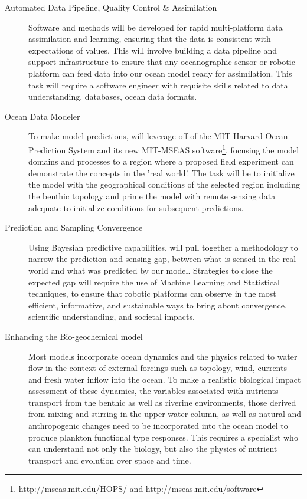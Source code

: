 \begin{description}

\item[Automated Data Pipeline, Quality Control \& Assimilation] Software and methods will be developed for
  rapid multi-platform data assimilation and learning, ensuring that the data is
  consistent with expectations of values. This will involve building a
  data pipeline and support infrastructure to ensure that any
  oceanographic sensor or robotic platform can feed data into our ocean
  model ready for assimilation. This task will require a software
  engineer with requisite skills related to data understanding,
  databases, ocean data formats.

\item[Ocean Data Modeler] To make model predictions, \pro will
  leverage off of the MIT Harvard Ocean Prediction
  System and its new MIT-MSEAS software\footnote{\url{http://mseas.mit.edu/HOPS/} and \url{http://mseas.mit.edu/software}}, focusing
  the model domains and processes to a region where a proposed field experiment
  can demonstrate the concepts in the 'real world'. The task will be
  to initialize the model with the geographical conditions of the
  selected region including the benthic topology and prime the model
  with remote sensing data adequate to initialize conditions for
  subsequent predictions.

\item[Prediction and Sampling Convergence] Using Bayesian predictive
  capabilities, \pro will pull together a methodology to narrow the
  prediction and sensing gap, between what is sensed in the real-world
  and what was predicted by our model. Strategies to close the expected
  gap will require the use of Machine Learning and Statistical
  techniques, to ensure that robotic platforms can observe in the most efficient, informative, and sustainable ways to
  bring about convergence, scientific understanding, and societal impacts. 

\item[Enhancing the Bio-geochemical model] Most models incorporate ocean
  dynamics and the physics related to water flow in the context of
  external forcings such as topology, wind, currents and fresh water
  inflow into the ocean. To make a realistic biological impact
  assessment of these dynamics, the variables associated with nutrients
  transport from the benthic as well as riverine environments, those
  derived from mixing and stirring in the upper water-column, as well as
  natural and anthropogenic changes need to be incorporated into the
  ocean model to produce plankton functional type responses. This
  requires a specialist who can understand not only the biology, but
  also the physics of nutrient transport and evolution over space and
  time.


\end{description}
